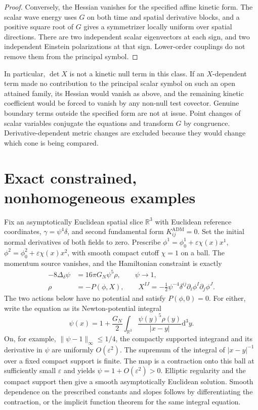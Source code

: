 \documentclass[11pt]{article}
\newcommand{\RR}{\mathbb R}
\newcommand{\dd}{\mathrm d}
\newcommand{\adm}{\mathrm{ADM}}
\begin{document}
\begin{proof}
Conversely, the Hessian vanishes for the specified affine kinetic form. The scalar wave energy uses \(G\) on both time and spatial derivative blocks, and a positive square root of \(G\) gives a symmetrizer locally uniform over spatial directions. There are two independent scalar eigenvectors at each sign, and two independent Einstein polarizations at that sign. Lower-order couplings do not remove them from the principal symbol.
\end{proof}

In particular, \(\det X\) is not a kinetic null term in this class. If an \(X\)-dependent term made no contribution to the principal scalar symbol on such an open attained family, its Hessian would vanish as above, and the remaining kinetic coefficient would be forced to vanish by any non-null test covector. Genuine boundary terms outside the specified form are not at issue. Point changes of scalar variables conjugate the equations and transform \(G\) by congruence. Derivative-dependent metric changes are excluded because they would change which cone is being compared.

\section{Exact constrained, nonhomogeneous examples}\label{sec:examples}
Fix an asymptotically Euclidean spatial slice \(\RR^3\) with Euclidean reference coordinates, \(\gamma=\psi^4\delta\), and second fundamental form \(K_{ij}^{\adm}=0\). Set the initial normal derivatives of both fields to zero. Prescribe \(\phi^1=\phi^1_0+\varepsilon\chi(x)x^1\), \(\phi^2=\phi^2_0+\varepsilon\chi(x)x^2\), with smooth compact cutoff \(\chi=1\) on a ball. The momentum source vanishes, and the Hamiltonian constraint is exactly
\begin{align}
 -8\Delta_\delta\psi&=16\pi G_N\psi^5\rho,\qquad \psi\longrightarrow1,\\
 \rho&=-P(\phi,X),\qquad X^{IJ}=-\tfrac12\psi^{-4}
       \delta^{ij}\partial_i\phi^I\partial_j\phi^J .
 \label{eq:constraint}
\end{align}
The two actions below have no potential and satisfy \(P(\phi,0)=0\). For either, write the equation as its Newton-potential integral
\[
 \psi(x)=1+\frac{G_N}{2}\int_{\RR^3}\frac{\psi(y)^5\rho(y)}{|x-y|}\dd^3y .
\]
On, for example, \(\|\psi-1\|_\infty\le1/4\), the compactly supported integrand and its derivative in \(\psi\) are uniformly \(O(\varepsilon^2)\). The supremum of the integral of \(|x-y|^{-1}\) over a fixed compact support is finite. The map is a contraction onto this ball at sufficiently small \(\varepsilon\) and yields \(\psi=1+O(\varepsilon^2)>0\). Elliptic regularity and the compact support then give a smooth asymptotically Euclidean solution. Smooth dependence on the prescribed constants and slopes follows by differentiating the contraction, or the implicit function theorem for the same integral equation.
\end{document}
